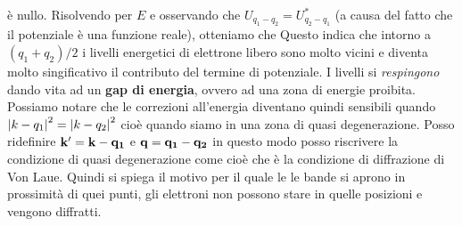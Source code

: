 \documentclass[a4paper,12pt]{article}
\begin{document}
è nullo. Risolvendo per $E$ e osservando che $U_{q_1-q_2} = U^*_{q_2-q_1}$ (a causa del fatto che il potenziale è una funzione reale), otteniamo che
Questo indica che intorno a $(q_1+q_2)/2$ i livelli energetici di elettrone libero sono molto vicini e diventa molto singificativo il contributo del termine di potenziale. I livelli si \textit{respingono} dando vita ad un \textbf{gap di energia}, ovvero ad una zona di energie proibita. Possiamo notare che le correzioni all'energia diventano quindi sensibili quando $\abs{k-q_1} ^2 = \abs{k-q_2} ^2$ cioè quando siamo in una zona di quasi degenerazione. Posso ridefinire ${\it\bf k'} = \it\bf k - \it\bf q_1$ e $\it\bf q = \it\bf q_1 - \it\bf q_2$ in questo modo posso riscrivere la condizione di quasi degenerazione come
cioè 
che è la condizione di diffrazione di Von Laue. Quindi si spiega il motivo per il quale le le bande si aprono in prossimità di quei punti, gli elettroni non possono stare in quelle posizioni e vengono diffratti.
\end{document}
